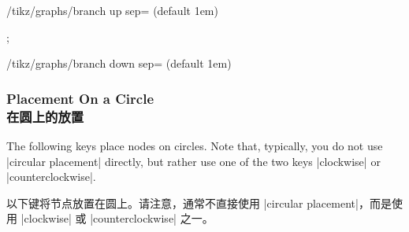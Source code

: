 \begin{key}{/tikz/graphs/branch up sep= (default 1em)}
%
\begin{codeexample}[preamble={\usetikzlibrary{graphs}}]
\tikz {};
\end{codeexample}
%
\end{key}

\begin{key}{/tikz/graphs/branch down sep= (default 1em)}
\end{key}


\subsubsection{Placement On a Circle\\在圆上的放置}

The following keys place nodes on circles. Note that, typically, you do not use
|circular placement| directly, but rather use one of the two keys |clockwise|
or |counterclockwise|.

以下键将节点放置在圆上。请注意，通常不直接使用 |circular placement|，而是使用 |clockwise| 或 |counterclockwise| 之一。

